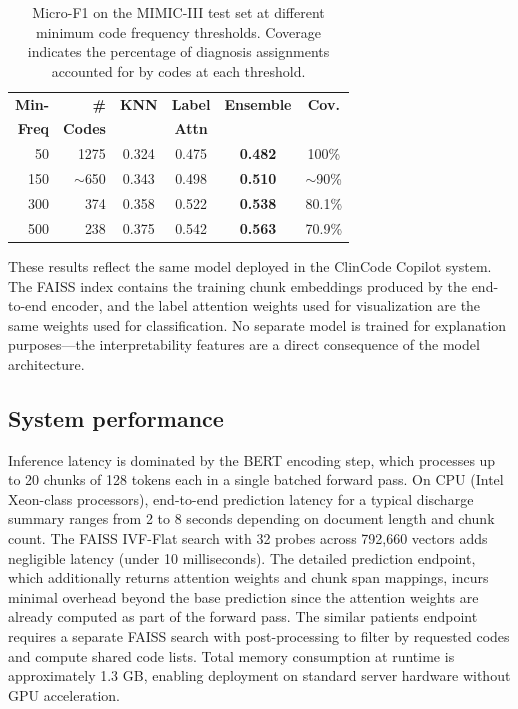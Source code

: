 \documentclass[conference]{IEEEtran}
\begin{document}
\begin{table}[t]
\caption{Micro-F1 on the MIMIC-III test set at different minimum code frequency thresholds. Coverage indicates the percentage of diagnosis assignments accounted for by codes at each threshold.}
\label{tab:performance}
\begin{center}
\begin{tabular}{r r c c c c}
\toprule
\textbf{Min-} & \textbf{\#} & \textbf{KNN} & \textbf{Label} & \textbf{Ensemble} & \textbf{Cov.} \\
\textbf{Freq} & \textbf{Codes} & & \textbf{Attn} & & \\
\midrule
50 & 1275 & 0.324 & 0.475 & \textbf{0.482} & 100\% \\
150 & $\sim$650 & 0.343 & 0.498 & \textbf{0.510} & $\sim$90\% \\
300 & 374 & 0.358 & 0.522 & \textbf{0.538} & 80.1\% \\
500 & 238 & 0.375 & 0.542 & \textbf{0.563} & 70.9\% \\
\bottomrule
\end{tabular}
\end{center}
\end{table}

These results reflect the same model deployed in the ClinCode Copilot system. The FAISS index contains the training chunk embeddings produced by the end-to-end encoder, and the label attention weights used for visualization are the same weights used for classification. No separate model is trained for explanation purposes---the interpretability features are a direct consequence of the model architecture.

\subsection{System performance}

Inference latency is dominated by the BERT encoding step, which processes up to 20 chunks of 128 tokens each in a single batched forward pass. On CPU (Intel Xeon-class processors), end-to-end prediction latency for a typical discharge summary ranges from 2 to 8 seconds depending on document length and chunk count. The FAISS IVF-Flat search with 32 probes across 792,660 vectors adds negligible latency (under 10 milliseconds). The detailed prediction endpoint, which additionally returns attention weights and chunk span mappings, incurs minimal overhead beyond the base prediction since the attention weights are already computed as part of the forward pass. The similar patients endpoint requires a separate FAISS search with post-processing to filter by requested codes and compute shared code lists. Total memory consumption at runtime is approximately 1.3 GB, enabling deployment on standard server hardware without GPU acceleration.
\end{document}
